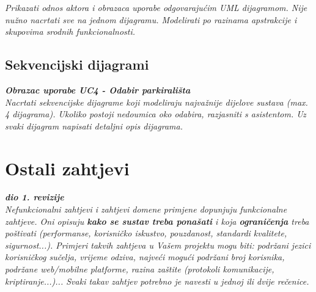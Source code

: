 					\textit{Prikazati odnos aktora i obrazaca uporabe odgovarajućim UML dijagramom. Nije nužno nacrtati sve na jednom dijagramu. Modelirati po razinama apstrakcije i skupovima srodnih funkcionalnosti.}
				\eject		
				
			\subsection{Sekvencijski dijagrami}
				
				\textbf{\textit{Obrazac uporabe UC4 - Odabir parkirališta}}\\
				
				\textit{Nacrtati sekvencijske dijagrame koji modeliraju najvažnije dijelove sustava (max. 4 dijagrama). Ukoliko postoji nedoumica oko odabira, razjasniti s asistentom. Uz svaki dijagram napisati detaljni opis dijagrama.}
				\eject
	
		\section{Ostali zahtjevi}
		
			\textbf{\textit{dio 1. revizije}}\\
		 
			 \textit{Nefunkcionalni zahtjevi i zahtjevi domene primjene dopunjuju funkcionalne zahtjeve. Oni opisuju \textbf{kako se sustav treba ponašati} i koja \textbf{ograničenja} treba poštivati (performanse, korisničko iskustvo, pouzdanost, standardi kvalitete, sigurnost...). Primjeri takvih zahtjeva u Vašem projektu mogu biti: podržani jezici korisničkog sučelja, vrijeme odziva, najveći mogući podržani broj korisnika, podržane web/mobilne platforme, razina zaštite (protokoli komunikacije, kriptiranje...)... Svaki takav zahtjev potrebno je navesti u jednoj ili dvije rečenice.}
			 
			 
			 
	